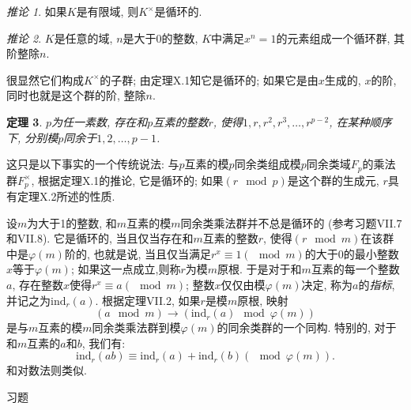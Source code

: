 \documentclass[12pt,a4paper]{book} %
\newtheorem{theorem}{定理}
\theoremstyle{remark}
\theoremstyle{example}
\theoremstyle{lemma}
\theoremstyle{corollary}
\newtheorem{corollary}[theorem]{推论}
\numberwithin{theorem}{chapter}
\begin{document}
\begin{corollary}
如果$K$是有限域, 则$K^{\times}$是循环的.
\end{corollary}

\begin{corollary}
$K$是任意的域, $n$是大于0的整数, $K$中满足$x^n = 1$的元素组成一个循环群, 其阶整除$n$.
\end{corollary}

很显然它们构成$K^{\times}$的子群; 由定理X.1知它是循环的; 如果它是由$x$生成的, $x$的阶, 同时也就是这个群的阶, 整除$n$.

\begin{theorem}
$p$为任一素数, 存在和$p$互素的整数$r$, 使得$1, r, r^2, r^3, \ldots, r^{p - 2}$, 在某种顺序下, 分别模$p$同余于$1, 2, \ldots, p - 1$.
\end{theorem}

这只是以下事实的一个传统说法: 与$p$互素的模$p$同余类组成模$p$同余类域$F_p$的乘法群$F_p^{\times}$, 根据定理X.1的推论, 它是循环的; 如果$(r \mod p)$是这个群的生成元, $r$具有定理X.2所述的性质.

设$m$为大于1的整数, 和$m$互素的模$m$同余类乘法群并不总是循环的 (参考习题VII.7和VII.8). 它是循环的, 当且仅当存在和$m$互素的整数$r$, 使得$(r \mod m)$在该群中是$\varphi(m)$阶的, 也就是说, 当且仅当满足$r^x \equiv 1 (\mod m)$的大于0的最小整数$x$等于$\varphi(m)$; 如果这一点成立,则称$r$为模$m$原根. 于是对于和$m$互素的每一个整数$a$, 存在整数$x$使得$r^x \equiv a (\mod m)$; 整数$x$仅仅由模$\varphi(m)$决定, 称为$a$的\emph{指标}, 并记之为${\text{ind}}_r(a)$. 根据定理VII.2, 如果$r$是模$m$原根, 映射
\[
(a \mod m) \rightarrow (\text{ind}_r(a) \mod \varphi(m))
\]
是与$m$互素的模$m$同余类乘法群到模$\varphi(m)$的同余类群的一个同构. 特别的, 对于和$m$互素的$a$和$b$, 我们有:
\[
\text{ind}_r(ab) \equiv \text{ind}_r(a) + \text{ind}_r(b) (\mod \varphi(m)).
\]
和对数法则类似.

习题
\end{document}

